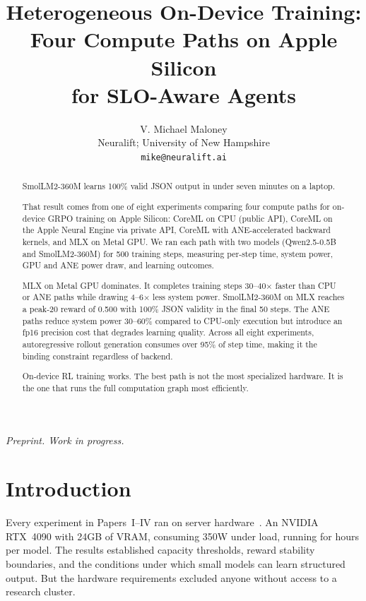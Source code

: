 \documentclass[11pt]{article}
\title{Heterogeneous On-Device Training:\\Four Compute Paths on Apple Silicon\\for SLO-Aware Agents}
\author{
V. Michael Maloney \\
Neuralift; University of New Hampshire \\
\texttt{mike@neuralift.ai}
}
\date{}
\begin{document}
\maketitle
\begin{center}
\textit{Preprint.  Work in progress.}
\end{center}

\begin{abstract}
SmolLM2-360M learns 100\% valid JSON output in under seven minutes on a laptop.

That result comes from one of eight experiments comparing four compute paths for on-device GRPO training on Apple Silicon: CoreML on CPU (public API), CoreML on the Apple Neural Engine via private API, CoreML with ANE-accelerated backward kernels, and MLX on Metal GPU.  We ran each path with two models (Qwen2.5-0.5B and SmolLM2-360M) for 500 training steps, measuring per-step time, system power, GPU and ANE power draw, and learning outcomes.

MLX on Metal GPU dominates.  It completes training steps 30--40$\times$ faster than CPU or ANE paths while drawing 4--6$\times$ less system power.  SmolLM2-360M on MLX reaches a peak-20 reward of 0.500 with 100\% JSON validity in the final 50 steps.  The ANE paths reduce system power 30--60\% compared to CPU-only execution but introduce an fp16 precision cost that degrades learning quality.  Across all eight experiments, autoregressive rollout generation consumes over 95\% of step time, making it the binding constraint regardless of backend.

On-device RL training works.  The best path is not the most specialized hardware.  It is the one that runs the full computation graph most efficiently.
\end{abstract}

\section{Introduction}

Every experiment in Papers~I--IV ran on server hardware~\cite{maloney2025deploymentgap,maloney2025capacity,maloney2025agentslobench,maloney2025dynamics}.  An NVIDIA RTX~4090 with 24GB of VRAM, consuming 350W under load, running for hours per model.  The results established capacity thresholds, reward stability boundaries, and the conditions under which small models can learn structured output.  But the hardware requirements excluded anyone without access to a research cluster.
\end{document}
